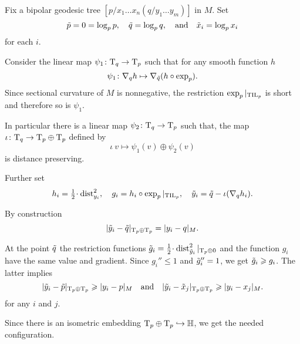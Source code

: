 \medskip

Fix a bipolar geodesic tree $[p/x_1\dots x_n(q/y_1\dots y_m)]$ in $M$.
Set 
\[\~p=0=\log_pp,\quad \~q=\log_pq,\quad\text{and}\quad \~x_i=\log_px_i\]
for each $i$. 

Consider the linear map $\psi_1\:\T_q\to \T_p$ such that for any smooth function $h$
\[\psi_1\:\nabla_{q}h\mapsto \nabla_{\~q}(h\circ\exp_p).\]
Since sectional curvature of $M$ is nonnegative, the restriction $\exp_p|_{\TIL_p}$ is short and therefore so is $\psi_1$.

In particular there is a linear map $\psi_2\:\T_q\to\T_p$ such that, the map $\iota\:\T_q\zz\to \T_p\oplus\T_p$ defined by
\[\iota\:v\mapsto \psi_1(v)\oplus \psi_2(v)\]
is distance preserving.

Further set 
\[h_i=\tfrac12\cdot\dist_{y_i}^2,
\quad
g_i=h_i\circ\exp_p|_{\TIL_p},
\quad
\~y_i=\~q-\iota(\nabla_q h_i).
\]


By construction
\[|\~y_i-\~q|_{\T_p\oplus\T_p}=|y_i-q|_M.\]

At the point $\~q$ the restriction functions $\~g_i=\tfrac12\cdot\dist^2_{\~y_i}|_{\T_p\oplus 0}$ and the function $g_i$ have the same value and gradient.
Since $g_i''\le 1$ and $\~g_i''=1$, we get $\~g_i\ge g_i$. 
The latter implies
\[
|\~y_i-\~p|_{\T_p\oplus\T_p}\ge|y_i-p|_M
\quad
\text{and}
\quad
|\~y_i-\~x_j|_{\T_p\oplus\T_p}\ge|y_i-x_j|_M.\]
for any $i$ and $j$.

Since there is an isometric embedding $\T_p\oplus\T_p\hookrightarrow \HH$,
we get the needed configuration.
\qeds


